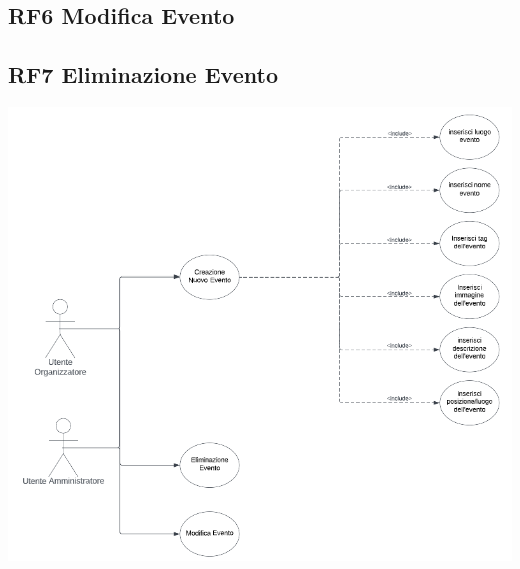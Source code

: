 \documentclass{article}
\begin{document}
\subsection{RF6 Modifica Evento}
\subsection{RF7 Eliminazione Evento}
\begin{center}
    \item[] \includegraphics[scale=0.5]{UseCase_2.png}
\end{center}
\end{document}
